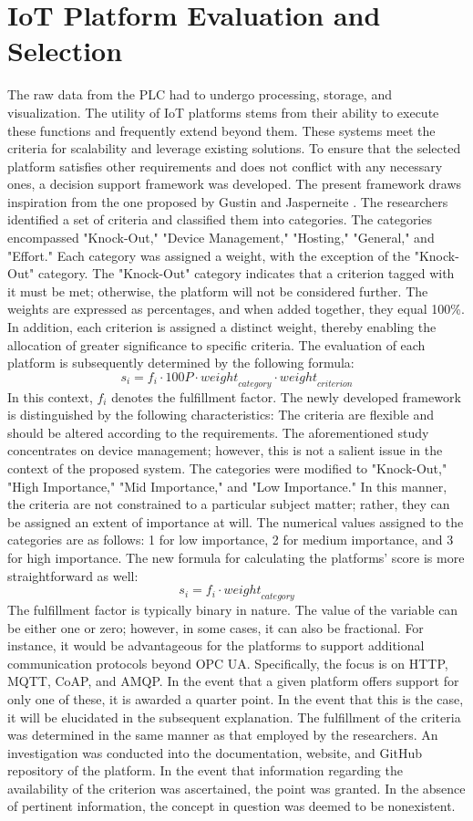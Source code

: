 \section{IoT Platform Evaluation and Selection} 
The raw data from the PLC had to undergo processing, storage, and visualization. The utility of IoT platforms stems from their ability to execute these functions and frequently extend beyond them.  These systems meet the criteria for scalability and leverage existing solutions. To ensure that the selected platform satisfies other requirements and does not conflict with any necessary ones, a decision support framework was developed. The present framework draws inspiration from the one proposed by Gustin and Jasperneite \cite{gustinIoTDeviceManagement2022}. The researchers identified a set of criteria and classified them into categories. The categories encompassed "Knock-Out," "Device Management," "Hosting," "General," and "Effort." Each category was assigned a weight, with the exception of the "Knock-Out" category. The "Knock-Out" category indicates that a criterion tagged with it must be met; otherwise, the platform will not be considered further. The weights are expressed as percentages, and when added together, they equal 100\%. In addition, each criterion is assigned a distinct weight, thereby enabling the allocation of greater significance to specific criteria. The evaluation of each platform is subsequently determined by the following formula:
\[ s_i = f_i \cdot 100P \cdot \mathit{weight}_{category} \cdot \mathit{weight}_{criterion} \]
In this context, $f_i$ denotes the fulfillment factor.
The newly developed framework is distinguished by the following characteristics: The criteria are flexible and should be altered according to the requirements. The aforementioned study concentrates on device management; however, this is not a salient issue in the context of the proposed system. The categories were modified to "Knock-Out," "High Importance," "Mid Importance," and "Low Importance." In this manner, the criteria are not constrained to a particular subject matter; rather, they can be assigned an extent of importance at will. The numerical values assigned to the categories are as follows: 1 for low importance, 2 for medium importance, and 3 for high importance. The new formula for calculating the platforms' score is more straightforward as well:
\[ s_i = f_i \cdot \mathit{weight}_{category} \]
The fulfillment factor is typically binary in nature. The value of the variable can be either one or zero; however, in some cases, it can also be fractional. For instance, it would be advantageous for the platforms to support additional communication protocols beyond OPC UA. Specifically, the focus is on HTTP, MQTT, CoAP, and AMQP. In the event that a given platform offers support for only one of these, it is awarded a quarter point. In the event that this is the case, it will be elucidated in the subsequent explanation. The fulfillment of the criteria was determined in the same manner as that employed by the researchers. An investigation was conducted into the documentation, website, and GitHub repository of the platform. In the event that information regarding the availability of the criterion was ascertained, the point was granted. In the absence of pertinent information, the concept in question was deemed to be nonexistent.

